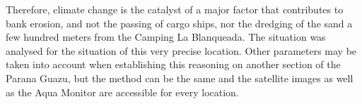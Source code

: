 Therefore, climate change is the catalyst of a major factor that contributes to bank erosion, and not the passing of cargo ships, nor the dredging of the sand a few hundred meters from the Camping La Blanqueada.
The situation was analysed for the situation of this very precise location. Other parameters may be taken into account when establishing this reasoning on another section of the Parana Guazu, but the method can be the same and the satellite images as well as the Aqua Monitor are accessible for every location. 

 